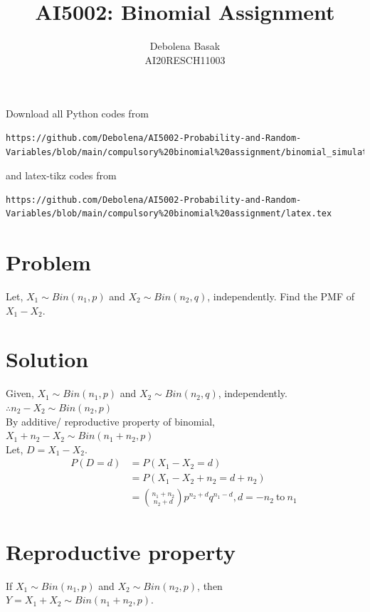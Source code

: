 \documentclass[journal,12pt,twocolumn]{IEEEtran}
\begin{document}
     \def\rightbox#1{\makebox[0in][r]{#1}}
     \def\centbox#1{\makebox[0in]{#1}}
     \def\topbox#1{\raisebox{-\baselineskip}[0in][0in]{#1}}
     \def\midbox#1{\raisebox{-0.5\baselineskip}[0in][0in]{#1}}
\vspace{3cm}
\title{AI5002: Binomial Assignment}
\author{Debolena Basak\\ AI20RESCH11003}
\maketitle
\newpage
\bigskip
\renewcommand{\thefigure}{\theenumi}
\renewcommand{\thetable}{\theenumi}
Download all Python codes from 
\begin{lstlisting}
https://github.com/Debolena/AI5002-Probability-and-Random-Variables/blob/main/compulsory%20binomial%20assignment/binomial_simulation.py
\end{lstlisting}
%
and latex-tikz codes from 
%
\begin{lstlisting}
https://github.com/Debolena/AI5002-Probability-and-Random-Variables/blob/main/compulsory%20binomial%20assignment/latex.tex
\end{lstlisting}
\section{Problem}
Let, $X_1 \sim Bin(n_1, p)$ and $X_2 \sim Bin(n_2, q)$, independently. Find the PMF of $X_1 - X_2.$
\section{Solution}
Given, $X_1 \sim Bin(n_1, p)$ and $X_2 \sim Bin(n_2, q)$, independently.\\
$\therefore n_2-X_2 \sim Bin(n_2, p)$\\
By additive/ reproductive property of binomial,\\
$X_1+n_2-X_2 \sim Bin(n_1+n_2, p)$\\
Let, $D= X_1 -X_2$.
\begin{align}
    P(D=d) &= P(X_1 -X_2 = d)\\
    &= P(X_1 -X_2 +n_2 = d +n_2)\\
    &= \binom{n_1+n_2}{n_2+d} p^{n_2+d} q^{n_1-d}, d= -n_2\ \text{to}\ n_1\ \label{subtraction}
\end{align}
\section{Reproductive property}
If $X_1 \sim  Bin(n_1, p)$ and $X_2 \sim Bin(n_2, p)$, then\\
$Y= X_1 + X_2 \sim Bin(n_1+n_2, p)$.
\end{document}
